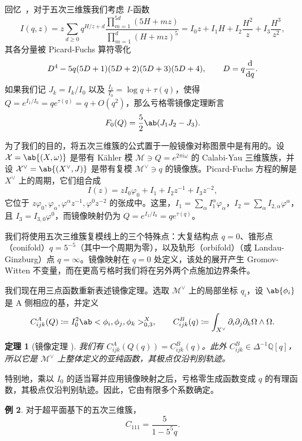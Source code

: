 \documentclass{amsart}
\newtheorem{thm}{定理}[section]
\theoremstyle{definition}
\newtheorem{exm}[thm]{例}
\theoremstyle{remark}
\theoremstyle{plain}
\theoremstyle{definition}
\theoremstyle{remark}
\newcommand{\Q}{\mathbb{Q}}
\newcommand{\mc}[1]{\mathcal{#1}}
\newcommand{\1}{\mathbf{1}}
\newcommand{\2}{\mathbf{2}}
\newcommand{\3}{\mathbf{3}}
\begin{document}
回忆~，对于五次三维簇我们考虑 \(I\)-函数
\[
    I(q,z) = z\sum_{d \geq 0} q^{H/z+d} \frac{\prod_{m=1}^{5d}(5H+mz)}{\prod_{m=1}^d (H+mz)^5} = I_0 z + I_1 H + I_2 \frac{H^2}{z} + I_3 \frac{H^3}{z^2},
\]
其各分量被 Picard-Fuchs 算符零化
\[ D^4 - 5q(5D+1)(5D+2)(5D+3)(5D+4), \qquad D = q \odv{}{q}. \]
如果我们记 \(J_k = I_k/I_0\) 以及 \(\frac{I_1}{I_0} = \log q + \tau(q)\)，使得 \(Q = e^{I_1/I_0} = qe^{\tau(q)} = q + O(q^2)\)，那么亏格零镜像定理断言
\[ F_0(Q) = \frac{5}{2}\ab(J_1 J_2 - J_3). \]

为了我们的目的，将五次三维簇的公式置于一般镜像对称图景中是有用的。设 \(\mc{X} = \ab\{(X,\omega)\}\) 是带有 Kähler 模 \(\mc{M} \ni Q = e^{2\pi i \omega}\) 的 Calabi-Yau 三维簇族，并设 \(\mc{X}^{\vee} = \ab\{(X^{\vee},J)\}\) 是带有复模 \(\mc{M}^{\vee} \ni q\) 的镜像族。Picard-Fuchs 方程的解是 \(X^{\vee}\) 上的周期，它们组合成
\[ I(z) = zI_0\varphi_0 + I_1 + I_2 z^{-1} + I_3 z^{-2}, \]
它位于 \(z\varphi_0, \varphi_{\alpha}, \varphi^{\alpha}z^{-1}, \varphi^0 z^{-2}\) 的张成中。这里，\(I_1 = \sum_{\alpha} I_1^{\alpha}\varphi_{\alpha}\)，\(I_2 = \sum_{\alpha} I_{2,\alpha}\varphi^{\alpha}\)，且 \(I_3 = I_{3,0}\varphi^0\)，而镜像映射仍为 \(Q = e^{I_1/I_0} = qe^{\tau(q)}\)。

我们将使用五次三维簇复模线上的三个特殊点：大复结构点 \(q=0\)、锥形点（conifold）\(q = 5^{-5}\)（其中一个周期为零），以及轨形（orbifold）（或 Landau-Ginzburg）点 \(q = \infty\)。镜像映射在 \(q=0\) 处定义，该处的展开产生 Gromov-Witten 不变量，而在更高亏格时我们将在另外两个点施加边界条件。

我们现在用三点函数重新表述镜像定理。选取 \(\mc{M}^{\vee}\) 上的局部坐标 \(q_i\)，设 \(\ab\{\phi_i\}\) 是 A 侧相应的基，并定义
\[ C^A_{ijk}(Q) \coloneqq I_0^2 \ab<\phi_i, \phi_j, \phi_k>^X_{0,3}, \qquad C^B_{ijk}(q) \coloneqq \int_{X^{\vee}} \partial_i \partial_j \partial_k \Omega \wedge \Omega. \]

\begin{thm}[镜像定理 {\cite{Givental1998,LLY1997}}]
    我们有 \(C^A_{ijk}(Q(q)) = C^B_{ijk}(q)\)。此外 \(C^B_{ijk} \in \Delta^{-1}\Q[q]\)，所以它是 \(\mc{M}^{\vee}\) 上整体定义的亚纯函数，其极点仅沿判别轨迹。
\end{thm}

特别地，乘以 \(I_0\) 的适当幂并应用镜像映射之后，亏格零生成函数变成 \(q\) 的有理函数，其极点仅沿判别轨迹。因此，它由有限多个系数确定。

\begin{exm}
    对于超平面基下的五次三维簇，
    \[ C_{111} = \frac{5}{1-5^5 q}. \]
\end{exm}
\end{document}
